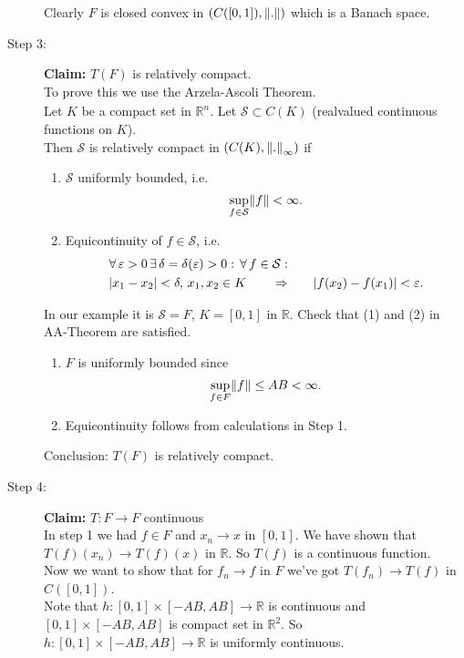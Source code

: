 \begin{beispiel}
\begin{description}
\[	\]
	Clearly $F$ is closed convex in $(C([0,1]),\norm{.})$ which is a Banach space.
	\item[Step 3:] \textbf{Claim:} \text{    }     $T(F)$ is relatively compact. \\
	To prove this we use the Arzela-Ascoli Theorem. \\
	$\phantom{...}$ \\
	Let $K$ be a compact set in $\mathbb{R}^n$. Let $\mathcal{S} \subset C(K)$ (realvalued continuous functions on $K$). \\
	Then $\mathcal{S}$ is relatively compact in $(C(K),\norm{.}_{\infty})$ if 
	\begin{enumerate}[(1)]
		\item $\mathcal{S}$ uniformly bounded, i.e.
		\[
			\sup_{f \in \mathcal{S}} \norm{f} < \infty.
		\]
		\item Equicontinuity of $f \in \mathcal{S}$, i.e.
		\begin{align*}
			\forall\, \varepsilon>0 \,\exists\, \delta = \delta (\varepsilon) >0: \,\forall\,  f \in \mathcal{S}: & \\
			\lvert x_1-x_2\rvert < \delta, \, x_1,x_2 \in K \qquad \Rightarrow & \qquad \lvert f(x_2)-f(x_1)\rvert< \varepsilon.
		\end{align*}
	\end{enumerate}
	In our example it is $\mathcal{S} = F$, $K = [0,1]$ in $\mathbb{R}$. Check that (1) and (2) in AA-Theorem are satisfied. \\
	\begin{enumerate}[(1)]
		\item $F$ is uniformly bounded since
	\[
		\sup_{f \in F}\norm{f} \leq AB < \infty.
	\]
	\item Equicontinuity follows from calculations in Step 1. \\
	\end{enumerate}	
	Conclusion: $T(F)$ is relatively compact.
	\item[Step 4:] \textbf{Claim:} \text{    }     $T: F \to F$ continuous \\
	In step 1 we had $f \in F$ and $x_n \to x$ in $[0,1]$. We have shown that $T(f)(x_n) \to T(f)(x)$ in $\mathbb{R}$. So $T(f)$ is a continuous function. \\
	Now we want to show that for $f_n \to f$ in $F$ we've got $T(f_n) \to T(f)$ in $C([0,1])$. \\
	Note that $h: [0,1] \times [-AB,AB] \to \mathbb{R}$ is continuous and $[0,1] \times [-AB,AB]$ is compact set in $\mathbb{R}^2$. So $h: [0,1] \times [-AB,AB] \to \mathbb{R}$ is uniformly continuous. \\

\end{description}
\end{beispiel}
